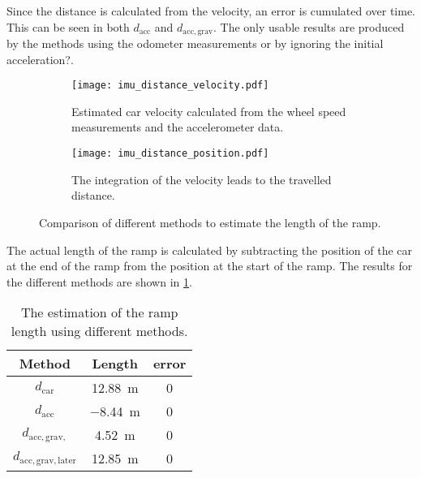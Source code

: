 Since the distance is calculated from the velocity, an error is cumulated over time.
This can be seen in both $d_\mathrm{acc}$ and $d_\mathrm{acc, grav}$.
The only usable results are produced by the methods using the odometer measurements or by ignoring the initial acceleration?.
\begin{figure}[htb]
	\centering
	\begin{subfigure}{1\textwidth}
		\centering
		\texttt{[image: imu\_distance\_velocity.pdf]}
		\caption{Estimated car velocity calculated from the wheel speed measurements and the accelerometer data.}
		\label{fig:imu_distance_velocity}
	\end{subfigure}
	
	\begin{subfigure}{1\textwidth}
		\centering
		\texttt{[image: imu\_distance\_position.pdf]}
		\caption{The integration of the velocity leads to the travelled distance.}
		\label{fig:imu_distance_position}
	\end{subfigure}
	\caption{Comparison of different methods to estimate the length of the ramp.}
\end{figure}

The actual length of the ramp is calculated by subtracting the position of the car at the end of the ramp from the position at the start of the ramp.
The results for the different methods are shown in \cref{tab:ramp_length}.

\begin{table}[htb]
	\centering
	\caption[Ramp length]{The estimation of the ramp length using different methods.}
	\label{tab:ramp_length}
	\begin{tabular}[t]{ccc}
		\toprule
		\textbf{Method}                & \textbf{Length}    & \textbf{error} \\
		\midrule
		$d_\mathrm{car} $              & \SI{12.88}{\metre} & 0              \\
		$d_\mathrm{acc} $              & \SI{-8.44}{\metre} & 0              \\
		$d_\mathrm{acc, grav, } $      & \SI{4.52}{\metre}  & 0              \\
		$d_\mathrm{acc, grav, later} $ & \SI{12.85}{\metre} & 0              \\
		\bottomrule
	\end{tabular}
\end{table}



